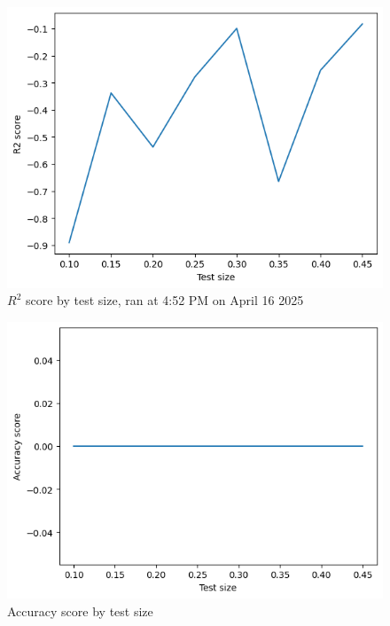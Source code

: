 \documentclass[runningheads]{llncs}
\begin{document}
\begin{figure}
    \centering
    \includegraphics[scale=0.75]{R2_CHART.png}   
    \caption{\(R^2\) score by test size, ran at 4:52 PM on April 16 2025}
    \label{fig:r2-label}
\end{figure}

\begin{figure}
    \centering
    \includegraphics[scale=0.75]{Accuracy_Chart.png}   
    \caption{Accuracy score by test size}
    \label{fig:accuracy-label}
\end{figure}
\end{document}
